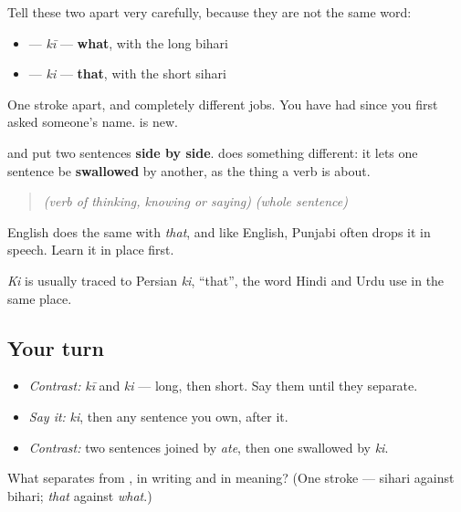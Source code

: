 \begin{cousinweb}
Tell these two apart very carefully, because they are not the same word:

\begin{itemize}
\raggedright
  \item \textbf{} — \emph{kī} — \textbf{what}, with the long bihari
  \item \textbf{} — \emph{ki} — \textbf{that}, with the short sihari
\end{itemize}

One stroke apart, and completely different jobs. You have had \textbf{} since you first asked someone's name. \textbf{} is new.

\textbf{} and \textbf{} put two sentences \textbf{side by side}. \textbf{} does something different: it lets one sentence be \textbf{swallowed} by another, as the thing a verb is about.

\begin{quote}
\emph{(verb of thinking, knowing or saying)} \textbf{} \emph{(whole sentence)}
\end{quote}

English does the same with \emph{that}, and like English, Punjabi often drops it in speech. Learn it in place first.

\emph{Ki} is usually traced to Persian \emph{ki}, \textquotedblleft{}that\textquotedblright{}, the word Hindi and Urdu use in the same place.
\end{cousinweb}

\subsection*{Your turn}
\begin{itemize}
\raggedright
  \item \emph{Contrast:} \emph{kī} and \emph{ki} — long, then short. Say them until they separate.
  \item \emph{Say it:} \emph{ki}, then any sentence you own, after it.
  \item \emph{Contrast:} two sentences joined by \emph{ate}, then one swallowed by \emph{ki}.
\end{itemize}

\begin{tcolorbox}[breakable,colback=teal!4,colframe=teal!35!black,title={Before you move on}]
What separates \textbf{} from \textbf{}, in writing and in meaning? (One stroke — sihari against bihari; \emph{that} against \emph{what}.)
\end{tcolorbox}

